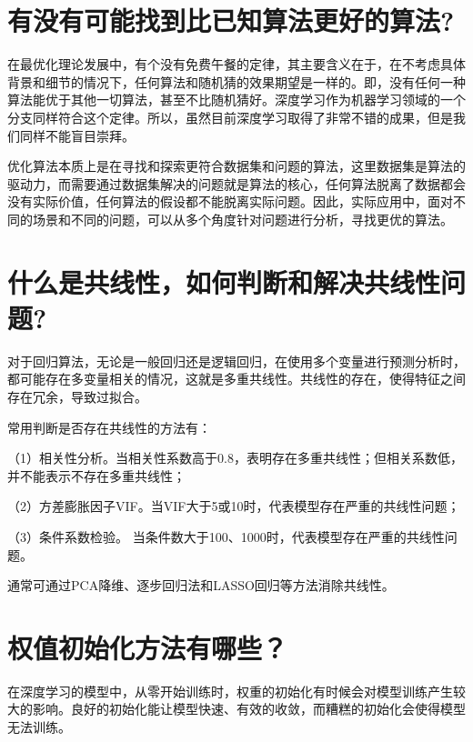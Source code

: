 \section{有没有可能找到比已知算法更好的算法?}\label{ux6709ux6ca1ux6709ux53efux80fdux627eux5230ux6bd4ux5df2ux77e5ux7b97ux6cd5ux66f4ux597dux7684ux7b97ux6cd5}

在最优化理论发展中，有个没有免费午餐的定律，其主要含义在于，在不考虑具体背景和细节的情况下，任何算法和随机猜的效果期望是一样的。即，没有任何一种算法能优于其他一切算法，甚至不比随机猜好。深度学习作为机器学习领域的一个分支同样符合这个定律。所以，虽然目前深度学习取得了非常不错的成果，但是我们同样不能盲目崇拜。

优化算法本质上是在寻找和探索更符合数据集和问题的算法，这里数据集是算法的驱动力，而需要通过数据集解决的问题就是算法的核心，任何算法脱离了数据都会没有实际价值，任何算法的假设都不能脱离实际问题。因此，实际应用中，面对不同的场景和不同的问题，可以从多个角度针对问题进行分析，寻找更优的算法。

\section{什么是共线性，如何判断和解决共线性问题?}\label{ux4ec0ux4e48ux662fux5171ux7ebfux6027ux5982ux4f55ux5224ux65adux548cux89e3ux51b3ux5171ux7ebfux6027ux95eeux9898}

对于回归算法，无论是一般回归还是逻辑回归，在使用多个变量进行预测分析时，都可能存在多变量相关的情况，这就是多重共线性。共线性的存在，使得特征之间存在冗余，导致过拟合。

常用判断是否存在共线性的方法有：

（1）相关性分析。当相关性系数高于0.8，表明存在多重共线性；但相关系数低，并不能表示不存在多重共线性；

（2）方差膨胀因子VIF。当VIF大于5或10时，代表模型存在严重的共线性问题；

（3）条件系数检验。
当条件数大于100、1000时，代表模型存在严重的共线性问题。

通常可通过PCA降维、逐步回归法和LASSO回归等方法消除共线性。

\section{权值初始化方法有哪些？}\label{ux6743ux503cux521dux59cbux5316ux65b9ux6cd5ux6709ux54eaux4e9b}

在深度学习的模型中，从零开始训练时，权重的初始化有时候会对模型训练产生较大的影响。良好的初始化能让模型快速、有效的收敛，而糟糕的初始化会使得模型无法训练。

